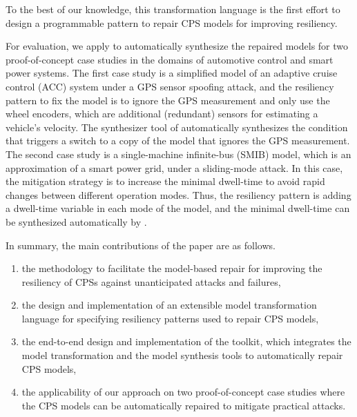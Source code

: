 %
To the best of our knowledge, this transformation language is the first effort to design a programmable pattern to repair CPS models for improving resiliency.
%


For evaluation, we apply \toolreaffirm to automatically synthesize the repaired models for two proof-of-concept case studies in the domains of automotive control and smart power systems. The first case study is a simplified model of an adaptive cruise control (ACC) system under a GPS sensor spoofing attack, and the resiliency pattern to fix the model is to ignore the GPS measurement and only use the wheel encoders, which are additional (redundant) sensors for estimating a vehicle's velocity. The synthesizer tool of \toolreaffirm automatically synthesizes the condition that triggers a switch to a copy of the model that ignores the GPS measurement. The second case study is a single-machine infinite-bus (SMIB) model, which is an approximation of a smart power grid, under a sliding-mode attack. In this case, the mitigation strategy is to increase the minimal dwell-time to avoid rapid changes between different operation modes. Thus, the resiliency pattern is adding a dwell-time variable in each mode of the model, and the minimal dwell-time can be synthesized automatically by \toolreaffirm.  
%
%
%

In summary, the main contributions of the paper are as follows.
%
\begin{enumerate}[leftmargin= 2 em]
\item the methodology to facilitate the model-based repair for improving the resiliency of CPSs against unanticipated attacks and failures,
\item the design and implementation of an extensible model transformation language for specifying resiliency patterns used to repair CPS models,
\item the end-to-end design and implementation of the toolkit, which integrates the model transformation and the model synthesis tools to automatically repair CPS models,
\item the applicability of our approach on two proof-of-concept case studies where the CPS models can be automatically repaired to mitigate practical attacks.
\end{enumerate}
%
%
%

